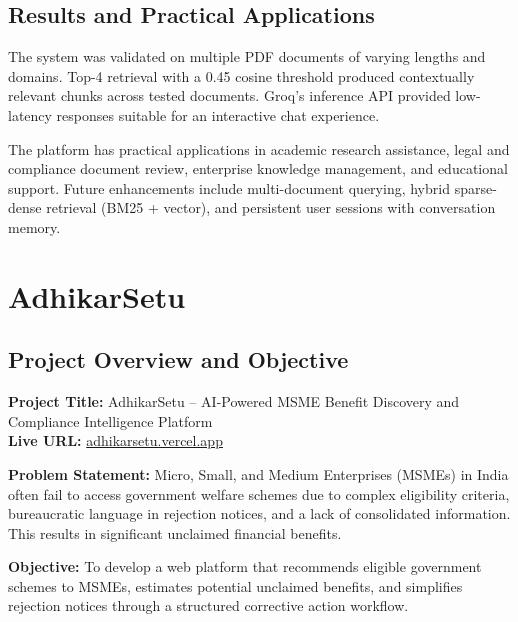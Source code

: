 \documentclass{book}
\begin{document}
\section{Results and Practical Applications}

\par\noindent The system was validated on multiple PDF documents of varying lengths and domains. Top-4 retrieval with a 0.45 cosine threshold produced contextually relevant chunks across tested documents. Groq's inference API provided low-latency responses suitable for an interactive chat experience.

\par\noindent The platform has practical applications in academic research assistance, legal and compliance document review, enterprise knowledge management, and educational support. Future enhancements include multi-document querying, hybrid sparse-dense retrieval (BM25 + vector), and persistent user sessions with conversation memory.

\chapter{AdhikarSetu}

\section{Project Overview and Objective}

\par\noindent \textbf{Project Title:} AdhikarSetu -- AI-Powered MSME Benefit Discovery and Compliance Intelligence Platform\\
\textbf{Live URL:} \href{https://adhikarsetu.vercel.app}{adhikarsetu.vercel.app}

\par\noindent \textbf{Problem Statement:} Micro, Small, and Medium Enterprises (MSMEs) in India often fail to access government welfare schemes due to complex eligibility criteria, bureaucratic language in rejection notices, and a lack of consolidated information. This results in significant unclaimed financial benefits.

\par\noindent \textbf{Objective:} To develop a web platform that recommends eligible government schemes to MSMEs, estimates potential unclaimed benefits, and simplifies rejection notices through a structured corrective action workflow.
\end{document}
